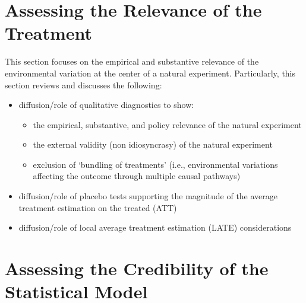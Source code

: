 \documentclass[11pt, english]{article}
\begin{document}
\section{Assessing the Relevance of the Treatment}

\noindent This section focuses on the empirical and substantive relevance of the
environmental variation at the center of a natural experiment.  Particularly,
this section reviews and discusses the following:

\begin{itemize}
    \item diffusion/role of qualitative diagnostics to show:
        \begin{itemize}
            \item the empirical, substantive, and policy relevance of the
                natural experiment
            \item the external validity (non idiosyncrasy) of the natural
                experiment
            \item exclusion of `bundling of treatments' (i.e., environmental
                variations affecting the outcome through multiple causal
                pathways)
        \end{itemize}
    \item diffusion/role of placebo tests supporting the magnitude of the
        average treatment estimation on the treated  (ATT)
    \item diffusion/role of local average treatment estimation (LATE) 
        considerations
\end{itemize}

%
%
%
%
%
%
%
%
%
%
%

\section{Assessing the Credibility of the Statistical Model}
\end{document}

